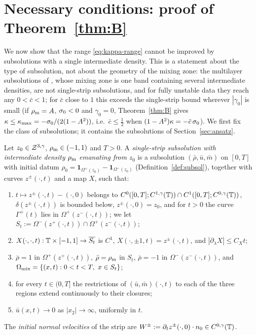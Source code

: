 \section{Necessary conditions: proof of Theorem~\ref{thm:B}}\label{sec:necessity}

We now show that the range \eqref{eq:kappa-range} cannot be improved by subsolutions with a single intermediate density. This is a statement about the type of subsolution, not about the
geometry of the mixing zone: the multilayer subsolutions of \cite[Sec.~7.5]{LM26}, whose mixing zone is one band containing several intermediate densities, are not single-strip subsolutions, and
for fully unstable data they reach any $0<\bar c<1$; for $\bar c$ close to $1$ this exceeds the single-strip bound wherever $|\gamma_0|$ is small (if $\rho_{\mathrm m}=A$, $\sigma_0<0$ and $\gamma_0=0$,
Theorem~\ref{thm:B} gives $\kappa\le\kappa_{\max}=-\sigma_0/(2(1-A^2))$, i.e.\ $\bar c\le\frac12$ when $(1-A^2)\kappa=-\bar c\,\sigma_0$). We first fix the class of subsolutions; it contains the subsolutions of
Section~\ref{sec:ansatz}.

\begin{definition}\label{def:single-strip}
Let $z_0\in\mathcal{Z}^{3,\gamma}$, $\rho_{\mathrm m}\in(-1,1)$ and $T>0$. A \emph{single-strip subsolution with intermediate density $\rho_{\mathrm m}$ emanating from $z_0$} is a subsolution $(\bar\rho,\bar u,\bar m)$ on
$[0,T]$ with initial datum $\rho_0=\mathbf 1_{\Omega^+(z_0)}-\mathbf 1_{\Omega^-(z_0)}$ (Definition~\ref{def:subsol}), together with curves $z^\pm(\cdot,t)$ and a map $X$, such that:
\begin{enumerate}[label=\textup{(S\arabic*)},leftmargin=*]
\item $t\mapsto z^\pm(\cdot,t)-(\cdot,0)$ belongs to $C^0([0,T];C^{1,\gamma}(\mathbb{T}))\cap C^1([0,T];C^{0,\gamma}(\mathbb{T}))$, $\delta(z^\pm(\cdot,t))$ is bounded below, $z^\pm(\cdot,0)=z_0$, and for $t>0$ the curve
$\Gamma^+(t)$ lies in $\Omega^+(z^-(\cdot,t))$; we let $S_t:=\Omega^-(z^+(\cdot,t))\cap\Omega^+(z^-(\cdot,t))$;
\item $X(\cdot,\cdot,t):\mathbb{T}\times[-1,1]\to\overline{S_t}$ is $C^1$, $X(\cdot,\pm1,t)=z^\pm(\cdot,t)$, and $|\partial_\lambda X|\le C_Xt$;
\item $\bar\rho=1$ in $\Omega^+(z^+(\cdot,t))$, $\bar\rho=\rho_{\mathrm m}$ in $S_t$, $\bar\rho=-1$ in $\Omega^-(z^-(\cdot,t))$, and $\Omega_{\rm mix}=\{(x,t):0<t<T,\ x\in S_t\}$;
\item for every $t\in(0,T]$ the restrictions of $(\bar u,\bar m)(\cdot,t)$ to each of the three regions extend continuously to their closures;
\item $\bar u(x,t)\to0$ as $|x_2|\to\infty$, uniformly in $t$.
\end{enumerate}
The \emph{initial normal velocities} of the strip are $W^\pm:=\partial_tz^\pm(\cdot,0)\cdot n_0\in C^{0,\gamma}(\mathbb{T})$.
\end{definition}

